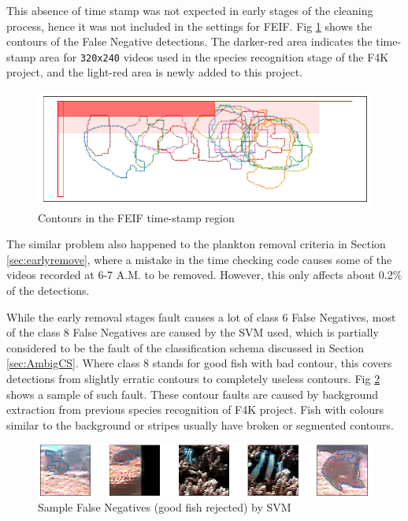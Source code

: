 \documentclass[bsc,frontabs,twoside,fullspacing,parskip,deptreport]{infthesis}
\begin{document}
This absence of time stamp was not expected in early stages of the cleaning process, hence it was not included in the settings for FEIF. 
Fig \ref{fig:feiffail2} shows the contours of the False Negative detections.
The darker-red area indicates the time-stamp area for {\tt 320x240} videos used in the species recognition stage of the F4K project, and the light-red area is newly added to this project.

\begin{figure}[h]
    \centering
    \includegraphics[scale=0.30]{graph/feiffail.png}
    \caption{Contours in the FEIF time-stamp region}
    \label{fig:feiffail2}
\end{figure}

The similar problem also happened to the plankton removal criteria in Section \ref{sec:earlyremove}, where a mistake in the time checking code causes some of the videos recorded at 6-7 A.M. to be removed. 
However, this only affects about 0.2\% of the detections.

While the early removal stages fault causes a lot of class 6 False Negatives, most of the class 8 False Negatives are caused by the SVM used, which is partially considered to be the fault of the classification schema discussed in Section \ref{sec:AmbigCS}.
Where class 8 stands for good fish with bad contour, this covers detections from slightly erratic contours to completely useless contours.
Fig \ref{fig:SVMfail} shows a sample of such fault. 
These contour faults are caused by background extraction from previous species recognition of F4K project.
Fish with colours similar to the background or stripes usually have broken or segmented contours.

\begin{figure}[h]
    \centering
    \includegraphics[scale=0.40]{graph/SVMfail.png}
    \caption{Sample False Negatives (good fish rejected) by SVM}
    \label{fig:SVMfail}
\end{figure}
\end{document}

